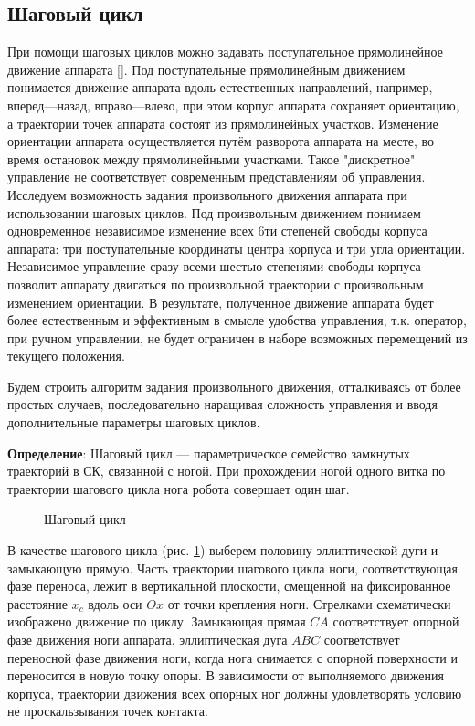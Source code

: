%


\subsection{Шаговый цикл}
\label{sec:step}
При помощи шаговых циклов можно задавать поступательное прямолинейное движение аппарата []. Под поступательные прямолинейным движением понимается движение аппарата вдоль естественных направлений, например, вперед---назад, вправо---влево, при этом корпус аппарата сохраняет ориентацию, а траектории  точек аппарата состоят из прямолинейных участков. Изменение ориентации аппарата осуществляется путём разворота аппарата на месте, во время остановок между прямолинейными участками. Такое "дискретное" управление не соответствует современным представлениям об управления. Исследуем возможность задания произвольного движения аппарата при использовании шаговых циклов.  
Под произвольным движением понимаем одновременное независимое изменение всех 6ти степеней свободы корпуса аппарата: три поступательные координаты центра корпуса и три угла ориентации. Независимое управление сразу всеми шестью степенями свободы корпуса позволит аппарату двигаться по произвольной траектории с произвольным изменением ориентации. В результате, полученное движение аппарата будет более естественным и эффективным в смысле удобства управления, т.к. оператор, при ручном управлении, не будет ограничен в наборе возможных перемещений из текущего положения.

Будем строить алгоритм задания произвольного движения, отталкиваясь от более простых случаев, последовательно наращивая сложность управления и вводя дополнительные параметры шаговых циклов.


{\bf Определение}: Шаговый цикл --- параметрическое семейство замкнутых траекторий в СК, связанной с ногой.
При прохождении ногой одного витка по траектории шагового цикла нога робота совершает один шаг.

\begin{figure}[h] 
\caption{Шаговый цикл}
\label{fig:step1}
\end{figure}

В качестве шагового цикла (рис. \ref{fig:step1}) выберем половину эллиптической дуги и замыкающую прямую. Часть траектории шагового цикла ноги, соответствующая фазе переноса, лежит в вертикальной плоскости, смещенной на фиксированное расстояние $x_c$  вдоль оси $Ox$ от точки крепления ноги. Стрелками схематически изображено движение по циклу. Замыкающая прямая $CA$ соответствует опорной фазе движения ноги аппарата, эллиптическая дуга $ABC$ соответствует переносной фазе движения ноги, когда нога снимается с опорной поверхности и переносится в новую точку опоры. В зависимости от выполняемого движения корпуса, траектории движения всех опорных ног должны удовлетворять условию не проскальзывания точек контакта.

